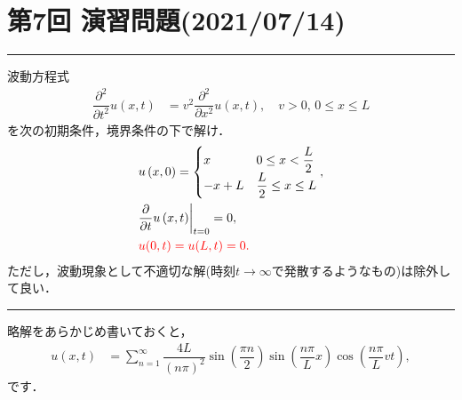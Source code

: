 \documentclass[11pt,a4]{jsarticle}
\numberwithin{equation}{section}
\begin{document}
\section*{第7回 演習問題(2021/07/14)}
%
\hrule
\vspace*{.2cm}
\enshu
波動方程式
\begin{align*}
 \dfrac{\partial^{2}}{\partial t^{2}}u\left(x,t\right) & =v^{2}\dfrac{\partial^{2}}{\partial x^{2}}u\left(x,t\right),\quad v>0,\,0\leq x\leq L
\end{align*}
を次の初期条件，境界条件の下で解け．
\begin{align*}
  & u\left(x,0\right)=\begin{cases}
x & 0\leq x<\dfrac{L}{2}\\
-x+L & \dfrac{L}{2}\leq x\leq L
\end{cases},\\
 & \dfrac{\partial}{\partial t}u\left(x,t\right)\biggr|_{t=0}=0, \\
 & \textcolor{red}{u(0,t) = u(L,t) = 0.}  
\end{align*}
ただし，波動現象として不適切な解(時刻$t\to \infty$で発散するようなもの)は除外して良い．
\vspace*{.2cm}
\hrule
\vspace*{.2cm}
%
略解をあらかじめ書いておくと，
\begin{align*}
 u\left(x,t\right) & =\sum_{n=1}^{\infty}\dfrac{4L}{\left(n\pi\right)^{2}}\sin\left(\dfrac{\pi n}{2}\right)\sin\left(\dfrac{n\pi}{L}x\right)\cos\left(\dfrac{n\pi}{L}vt\right),
\end{align*}
です．
\end{document}
